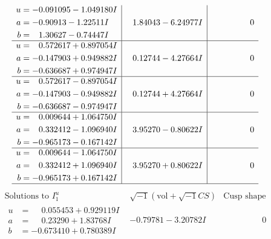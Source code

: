\documentclass[1p]{elsarticle_modified}
\theoremstyle{definition}
\newcommand{\I}{\sqrt{-1}}
\begin{document}
$$\begin{array}{c|c|c}
\begin{aligned}
u &= -0.091095 - 1.049180 I \\
a &= -0.90913 - 1.22511 I \\
b &= \phantom{-}1.30627 - 0.74447 I\end{aligned}
 & \phantom{-}1.84043 - 6.24977 I & \phantom{-0.000000 } 0 \\ \hline\begin{aligned}
u &= \phantom{-}0.572617 + 0.897054 I \\
a &= -0.147903 + 0.949882 I \\
b &= -0.636687 + 0.974947 I\end{aligned}
 & \phantom{-}0.12744 - 4.27664 I & \phantom{-0.000000 } 0 \\ \hline\begin{aligned}
u &= \phantom{-}0.572617 - 0.897054 I \\
a &= -0.147903 - 0.949882 I \\
b &= -0.636687 - 0.974947 I\end{aligned}
 & \phantom{-}0.12744 + 4.27664 I & \phantom{-0.000000 } 0 \\ \hline\begin{aligned}
u &= \phantom{-}0.009644 + 1.064750 I \\
a &= \phantom{-}0.332412 - 1.096940 I \\
b &= -0.965173 - 0.167142 I\end{aligned}
 & \phantom{-}3.95270 - 0.80622 I & \phantom{-0.000000 } 0 \\ \hline\begin{aligned}
u &= \phantom{-}0.009644 - 1.064750 I \\
a &= \phantom{-}0.332412 + 1.096940 I \\
b &= -0.965173 + 0.167142 I\end{aligned}
 & \phantom{-}3.95270 + 0.80622 I & \phantom{-0.000000 } 0\\
 \hline 
 \end{array}$$\newpage$$\begin{array}{c|c|c}  
\text{Solutions to }I^u_{1}& \I (\text{vol} + \sqrt{-1}CS) & \text{Cusp shape}\\
 \hline 
\begin{aligned}
u &= \phantom{-}0.055453 + 0.929119 I \\
a &= \phantom{-}0.23290 + 1.83768 I \\
b &= -0.673410 + 0.780389 I\end{aligned}
 & -0.79781 - 3.20782 I & \phantom{-0.000000 } 0 \\ \hline\begin{aligned}

\end{aligned}
\end{array}$$
\end{document}
